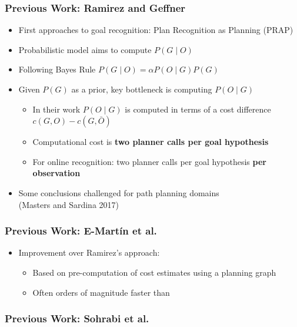\documentclass{beamer}
\begin{document}
	\begin{frame}[c]\frametitle{Previous Work: Ramirez and Geffner}
		\begin{itemize}
			\item First approaches to goal recognition: Plan Recognition as Planning (PRAP)
			\item Probabilistic model aims to compute $P(G \mid O)$
			\item Following Bayes Rule $P(G \mid O) = \alpha P(O \mid G) P(G)$
			\item Given $P(G)$ as a prior, key bottleneck is computing $P(O \mid G)$
			\begin{itemize}
				\item In their work $P(O \mid G)$ is computed in terms of a cost difference $c(G,O) - c(G,\bar{O})$
				\item Computational cost is \textbf{two planner calls per goal hypothesis}
				\item For online recognition: two planner calls per goal hypothesis \textbf{per observation}
			\end{itemize}
			\item Some conclusions challenged for path planning domains\\ (Masters and Sardina 2017)
		\end{itemize}
	\end{frame}
	\begin{frame}[c]\frametitle{Previous Work: E-Martín et al.}
		\begin{itemize}
			\item Improvement over Ramirez's approach:
			\begin{itemize}
				\item Based on pre-computation of cost estimates using a planning graph
				\item Often orders of magnitude faster than 
			\end{itemize}
		\end{itemize}
	\end{frame}
	\begin{frame}[c]\frametitle{Previous Work: Sohrabi et al.}
		
	\end{frame}
\fi
	
\end{document}
